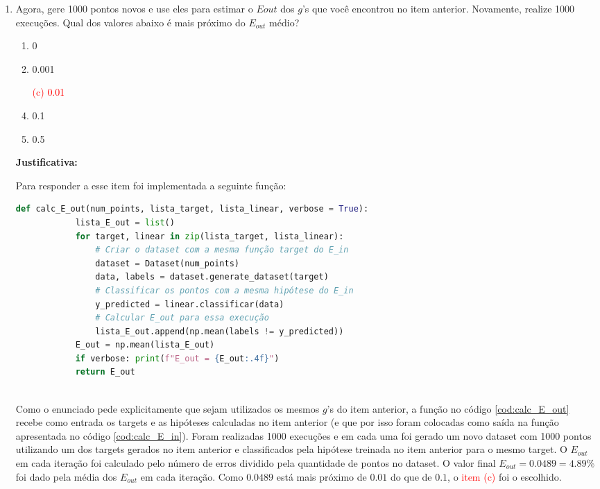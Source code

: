 \begin{enumerate}
    \item Agora, gere 1000 pontos novos e use eles para estimar o $Eout$ dos $g$'s que você encontrou no item anterior. Novamente, realize 1000 execuções. Qual dos valores abaixo é mais próximo do $E_{out}$ médio?
    
    \begin{enumerate}
        \item 0
        \item 0.001
        \item[\textcolor{red}{(c)}]\textcolor{red}{0.01}\addtocounter{enumii}{1}
        \item 0.1
        \item 0.5
    \end{enumerate}

    \par

    \textbf{Justificativa:}

    Para responder a esse item foi implementada a seguinte função:

    \begin{lstlisting}[language=Python, caption=Cálculo do E\_out, label=cod:calc_E_out]
        def calc_E_out(num_points, lista_target, lista_linear, verbose = True):
            lista_E_out = list()
            for target, linear in zip(lista_target, lista_linear):
                # Criar o dataset com a mesma função target do E_in
                dataset = Dataset(num_points)
                data, labels = dataset.generate_dataset(target)
                # Classificar os pontos com a mesma hipótese do E_in
                y_predicted = linear.classificar(data)
                # Calcular E_out para essa execução
                lista_E_out.append(np.mean(labels != y_predicted))
            E_out = np.mean(lista_E_out)
            if verbose: print(f"E_out = {E_out:.4f}")
            return E_out
    
    \end{lstlisting}

    Como o enunciado pede explicitamente que sejam utilizados os mesmos $g$'s do item anterior, a função no código \ref{cod:calc_E_out} recebe como entrada os targets e as hipóteses calculadas no item anterior (e que por isso foram colocadas como saída na função apresentada no código \ref{cod:calc_E_in}). Foram realizadas 1000 execuções e em cada uma foi gerado um novo dataset com 1000 pontos utilizando um dos targets gerados no item anterior e classificados pela hipótese treinada no item anterior para o mesmo target. O $E_{out}$ em cada iteração foi calculado pelo número de erros dividido pela quantidade de pontos no dataset. O valor final $E_{out} = 0.0489 = 4.89\%$ foi dado pela média dos $E_{out}$ em cada iteração. Como $0.0489$ está mais próximo de $0.01$ do que de $0.1$, o \textcolor{red}{item (c)} foi o escolhido.


\end{enumerate}
